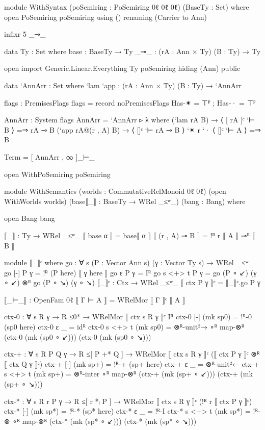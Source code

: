 \begin{code}
  module WithSyntax (poSemiring : PoSemiring 0ℓ 0ℓ 0ℓ) (BaseTy : Set) where
    open PoSemiring poSemiring using () renaming (Carrier to Ann)

    infixr 5 _⊸_

    data Ty : Set where
      base : BaseTy → Ty
      _⊸_ : (rA : Ann × Ty) (B : Ty) → Ty

    open import Generic.Linear.Everything Ty poSemiring hiding (Ann) public

    data `AnnArr : Set where
      `lam `app : (rA : Ann × Ty) (B : Ty) → `AnnArr

    flags : PremisesFlags
    flags = record noPremisesFlags { Has-✴ = ⊤ᴾ ; Has-· = ⊤ᴾ }

    AnnArr : System flags
    AnnArr = `AnnArr ▹ λ where
      (`lam rA B) → ⟨ [ rA ]ᶜ `⊢ B ⟩ =⇒ rA ⊸ B
      (`app rA@(r , A) B) → ⟨ []ᶜ `⊢ rA ⊸ B ⟩ `✴ r `· ⟨ []ᶜ `⊢ A ⟩ =⇒ B

    Term = [ AnnArr , ∞ ]_⊢_

    open WithPoSemiring poSemiring

    module WithSemantics
      (worlds : CommutativeRelMonoid 0ℓ 0ℓ) (open WithWorlds worlds)
      (base⟦_⟧ : BaseTy → WRel _≤ʷ_) (bang : Bang)
      where

      open Bang bang

      ⟦_⟧ : Ty → WRel _≤ʷ_
      ⟦ base α ⟧ = base⟦ α ⟧
      ⟦ (r , A) ⊸ B ⟧ = !ᴿ r ⟦ A ⟧ ⊸ᴿ ⟦ B ⟧

      module ⟦_⟧ᶜ where
        go : ∀ {s} (P : Vector Ann s) (γ : Vector Ty s) → WRel _≤ʷ_
        go {[-]} P γ = !ᴿ (P here) ⟦ γ here ⟧
        go {ε} P γ = Iᴿ
        go {s <+> t} P γ = go (P ∘ ↙) (γ ∘ ↙) ⊗ᴿ go (P ∘ ↘) (γ ∘ ↘)
      ⟦_⟧ᶜ : Ctx → WRel _≤ʷ_
      ⟦ ctx P γ ⟧ᶜ = ⟦_⟧ᶜ.go P γ

      ⟦_⊢_⟧ : OpenFam 0ℓ
      ⟦ Γ ⊢ A ⟧ = WRelMor ⟦ Γ ⟧ᶜ ⟦ A ⟧

      ctx-0 : ∀ {s R γ} → R ≤0* → WRelMor ⟦ ctx {s} R γ ⟧ᶜ Iᴿ
      ctx-0 {[-]} (mk sp0) = !ᴿ-0 (sp0 here)
      ctx-0 {ε} _ = idᴿ
      ctx-0 {s <+> t} (mk sp0) =
        ⊗ᴿ-unit²→ ∘ᴿ map-⊗ᴿ (ctx-0 (mk (sp0 ∘ ↙))) (ctx-0 (mk (sp0 ∘ ↘)))

      ctx-+ : ∀ {s R P Q γ} → R ≤[ P +* Q ] →
        WRelMor ⟦ ctx {s} R γ ⟧ᶜ (⟦ ctx P γ ⟧ᶜ ⊗ᴿ ⟦ ctx Q γ ⟧ᶜ)
      ctx-+ {[-]} (mk sp+) = !ᴿ-+ (sp+ here)
      ctx-+ {ε} _ = ⊗ᴿ-unit²←
      ctx-+ {s <+> t} (mk sp+) =
        ⊗ᴿ-inter ∘ᴿ map-⊗ᴿ (ctx-+ (mk (sp+ ∘ ↙))) (ctx-+ (mk (sp+ ∘ ↘)))

      ctx-* : ∀ {s R r P γ} → R ≤[ r *ₗ P ] →
        WRelMor ⟦ ctx {s} R γ ⟧ᶜ (!ᴿ r ⟦ ctx P γ ⟧ᶜ)
      ctx-* {[-]} (mk sp*) = !ᴿ-* (sp* here)
      ctx-* {ε} _ = !ᴿ-I
      ctx-* {s <+> t} (mk sp*) =
        !ᴿ-⊗ ∘ᴿ map-⊗ᴿ (ctx-* (mk (sp* ∘ ↙))) (ctx-* (mk (sp* ∘ ↘)))


\end{code}
